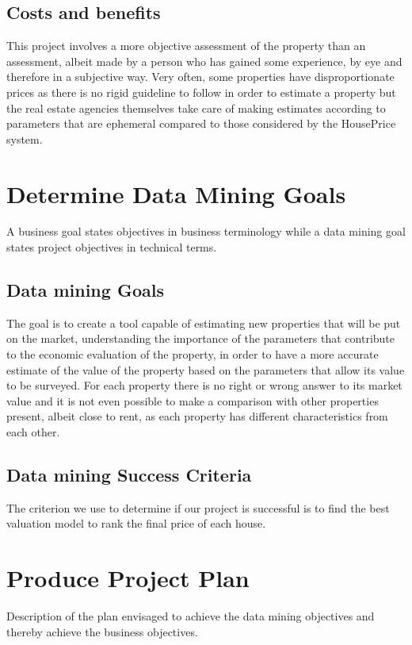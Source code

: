 \subsection{Costs and benefits}
This project involves a more objective assessment of the property than an assessment, albeit made by a person who has gained some experience, by eye and therefore in a subjective way. Very often, some properties have disproportionate prices as there is no rigid guideline to follow in order to estimate a property but the real estate agencies themselves take care of making estimates according to parameters that are ephemeral compared to those considered by the HousePrice system.



\section{Determine Data Mining Goals}
A business goal states objectives in business terminology while a data mining goal states project objectives in technical terms.

\subsection{Data mining Goals}
The goal is to create a tool capable of estimating new properties that will be put on the market, understanding the importance of the parameters that contribute to the economic evaluation of the property, in order to have a more accurate estimate of the value of the property based on the parameters that allow its value to be surveyed. For each property there is no right or wrong answer to its market value and it is not even possible to make a comparison with other properties present, albeit close to rent, as each property has different characteristics from each other.

\subsection{Data mining Success Criteria}
The criterion we use to determine if our project is successful is to find the best valuation model to rank the final price of each house.

\section{Produce Project Plan}
Description of the plan envisaged to achieve the data mining objectives and thereby achieve the business objectives.

